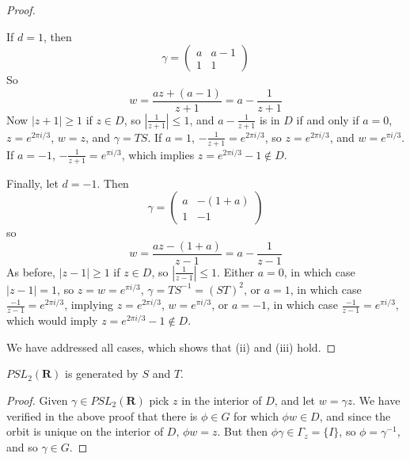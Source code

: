 \begin{proof}
\begin{itemize}
        If $d = 1$, then
        \[ \gamma = \begin{pmatrix} a & a-1 \\ 1 & 1 \end{pmatrix} \]
        So
        \[ w = \frac{az + (a-1)}{z + 1} = a - \frac{1}{z+1} \]
        Now $|z+1| \geq 1$ if $z \in D$, so $|\frac{1}{z+1}| \leq 1$, and $a - \frac{1}{z+1}$ is in $D$ if and only if $a = 0$, $z = e^{2\pi i/3}$, $w = z$, and $\gamma = TS$. If $a = 1$, $- \frac{1}{z+1} = e^{2\pi i/3}$, so $z = e^{2 \pi i/3}$, and $w = e^{\pi i/3}$. If $a = -1$, $- \frac{1}{z+1} = e^{\pi i/3}$, which implies $z = e^{2 \pi i/3} - 1 \not \in D$.

        Finally, let $d = -1$. Then
        \[ \gamma = \begin{pmatrix} a & -(1 + a) \\ 1 & -1 \end{pmatrix} \]
        so
        \[ w = \frac{az - (1+a)}{z-1} = a - \frac{1}{z-1} \]
        As before, $|z-1| \geq 1$ if $z \in D$, so $|\frac{1}{z-1}| \leq 1$. Either $a = 0$, in which case $|z-1| = 1$, so $z = w = e^{\pi i/3}$, $\gamma = TS^{-1} = (ST)^2$, or $a = 1$, in which case $\frac{-1}{z-1} = e^{2\pi i/3}$, implying $z = e^{2\pi i/3}$, $w = e^{\pi i/3}$, or $a = -1$, in which case $\frac{-1}{z-1} = e^{\pi i/3}$, which would imply $z = e^{2\pi i/3} - 1 \not \in D$.
    \end{itemize}
    We have addressed all cases, which shows that (ii) and (iii) hold.
\end{proof}

\begin{corollary}
    $PSL_2(\mathbf{R})$ is generated by $S$ and $T$.
\end{corollary}
\begin{proof}
    Given $\gamma \in PSL_2(\mathbf{R})$ pick $z$ in the interior of $D$, and let $w = \gamma z$. We have verified in the above proof that there is $\phi \in G$ for which $\phi w \in D$, and since the orbit is unique on the interior of $D$, $\phi w = z$. But then $\phi \gamma \in \Gamma_z = \{ I \}$, so $\phi = \gamma^{-1}$, and so $\gamma \in G$.
\end{proof}

